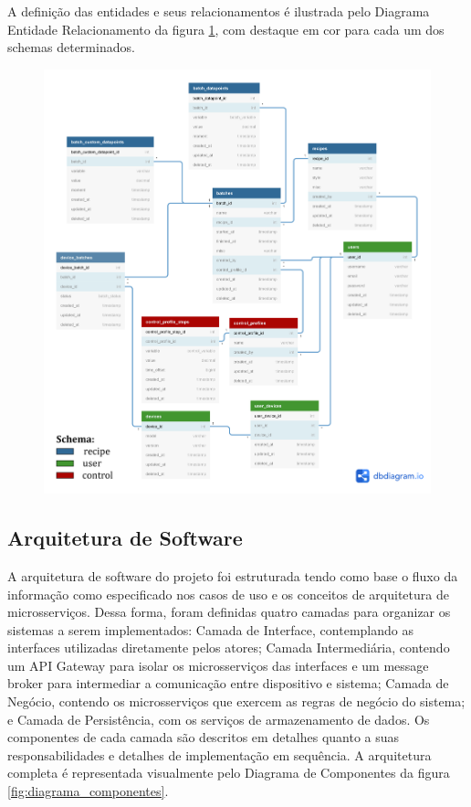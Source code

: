 A definição das entidades e seus relacionamentos é ilustrada pelo Diagrama Entidade Relacionamento da figura \ref{fig:diagrama_entidade_relacionamento}, com destaque em cor para cada um dos schemas determinados.

\begin{figure}[H]
    \centering
    \includegraphics[scale=0.16]{figuras/projeto/software/banco_de_dados.png}
    \label{fig:diagrama_entidade_relacionamento}
\end{figure}

\subsection{Arquitetura de Software}

A arquitetura de software do projeto foi estruturada tendo como base o fluxo da informação como especificado nos casos de uso e os conceitos de arquitetura de microsserviços. Dessa forma, foram definidas quatro camadas para organizar os sistemas a serem implementados: Camada de Interface, contemplando as interfaces utilizadas diretamente pelos atores; Camada Intermediária, contendo um API Gateway para isolar os microsserviços das interfaces e um message broker para intermediar a comunicação entre dispositivo e sistema; Camada de Negócio, contendo os microsserviços que exercem as regras de negócio do sistema; e Camada de Persistência, com os serviços de armazenamento de dados. Os componentes de cada camada são descritos em detalhes quanto a suas responsabilidades e detalhes de implementação em sequência. A arquitetura completa é representada visualmente pelo Diagrama de Componentes da figura \ref{fig:diagrama_componentes}.

